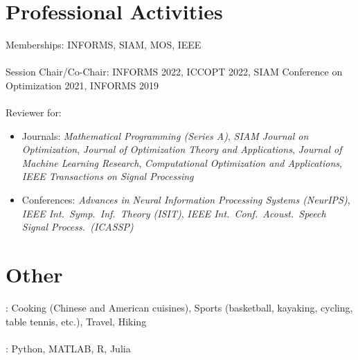 \documentclass[11pt]{article}
\newcommand{\ICASSP}{IEEE Int.\ Conf.\ Acoust.\ Speech Signal Process.\ (ICASSP)}
\newcommand{\ISIT}{IEEE Int.\ Symp.\ Inf.\ Theory (ISIT)}
\newcommand{\TSP}{IEEE Transactions on Signal Processing}
\newcommand{\SIOPT}{SIAM Journal on Optimization}
\newcommand{\JMLR}{Journal of Machine Learning Research}
\newcommand{\MPA}{Mathematical Programming (Series A)}
\newcommand{\COA}{Computational Optimization and Applications}
\newcommand{\JOTA}{Journal of Optimization Theory and Applications}
\newcommand{\NIPS}{Advances in Neural Information Processing Systems (NeurIPS)}
\begin{document}
    


\section*{Professional Activities}
{\noindent
Memberships: INFORMS, SIAM, MOS, IEEE\\\\
Session Chair/Co-Chair: INFORMS 2022, ICCOPT 2022, SIAM Conference on Optimization 2021, INFORMS 2019\\\\
Reviewer for: 
\begin{itemize}
\item Journals: {\em \MPA}, {\em\SIOPT}, {\em\JOTA}, {\em\JMLR}, {\em\COA}, {\em\TSP}
\item Conferences: {\em\NIPS}, {\em\ISIT}, {\em\ICASSP}
\end{itemize}   %
}

\section*{Other}

: Cooking (Chinese and American cuisines), Sports (basketball, kayaking, cycling, table tennis, etc.), Travel, Hiking\\ \\
: Python, MATLAB, R, Julia
\end{document}
